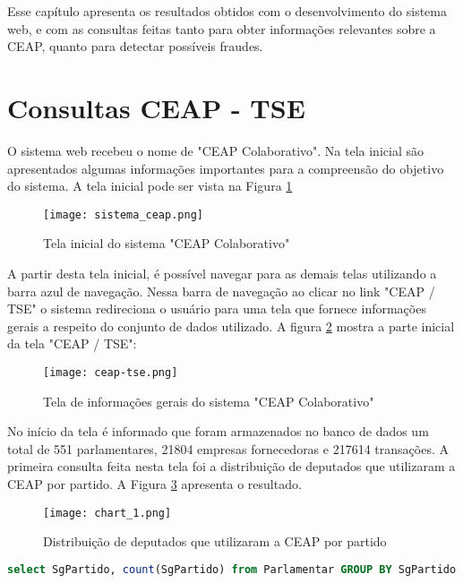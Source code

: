 Esse capítulo apresenta os resultados obtidos com o desenvolvimento do sistema web, e com as consultas feitas tanto para obter informações relevantes sobre a CEAP, quanto para detectar possíveis fraudes.

\section{Consultas CEAP - TSE}

O sistema web recebeu o nome de "CEAP Colaborativo". Na tela inicial são apresentados algumas informações importantes para a compreensão do objetivo do sistema. A tela inicial pode ser vista na Figura \ref{fig:sistema_ceap}

\begin{figure}[H]
\centering
\texttt{[image: sistema\_ceap.png]}
\caption{Tela inicial do sistema "CEAP Colaborativo"}
\label{fig:sistema_ceap}
\end{figure}

A partir desta tela inicial, é possível navegar para as demais telas utilizando a barra azul de navegação. Nessa barra de navegação ao clicar no link "CEAP / TSE" o sistema redireciona o usuário para uma tela que fornece informações gerais a respeito do conjunto de dados utilizado. A figura \ref{fig:sistema_ceap_tse} mostra a parte inicial da tela "CEAP / TSE":

\begin{figure}[H]
\centering
\texttt{[image: ceap-tse.png]}
\caption{Tela de informações gerais do sistema "CEAP Colaborativo"}
\label{fig:sistema_ceap_tse}
\end{figure}

No início da tela é informado que foram armazenados no banco de dados um total de 551 parlamentares, 21804 empresas fornecedoras e 217614 transações.
A primeira consulta feita nesta tela foi a distribuição de deputados que utilizaram a CEAP por partido. A Figura \ref{fig:chart_1} apresenta o resultado.

\begin{figure}[H]
\centering
\texttt{[image: chart\_1.png]}
\caption{Distribuição de deputados que utilizaram a CEAP por partido}
\label{fig:chart_1}
\end{figure}

\begin{lstlisting}[label={lst:consulta_chart_1}, caption={Consulta para o gráfico \ref{fig:chart_1}},captionpos=b, language=sql]
select SgPartido, count(SgPartido) from Parlamentar GROUP BY SgPartido
\end{lstlisting}


